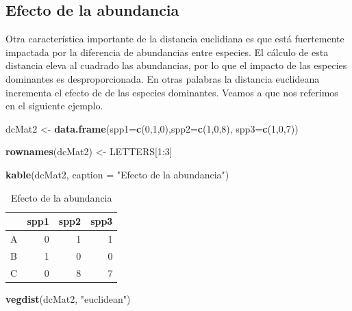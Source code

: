 \documentclass[]{book}
\newenvironment{Shaded}{\begin{snugshade}}{\end{snugshade}}
\newcommand{\KeywordTok}[1]{\textcolor[rgb]{0.13,0.29,0.53}{\textbf{{#1}}}}
\newcommand{\DataTypeTok}[1]{\textcolor[rgb]{0.13,0.29,0.53}{{#1}}}
\newcommand{\DecValTok}[1]{\textcolor[rgb]{0.00,0.00,0.81}{{#1}}}
\newcommand{\StringTok}[1]{\textcolor[rgb]{0.31,0.60,0.02}{{#1}}}
\newcommand{\NormalTok}[1]{{#1}}
\begin{document}
\subsection{Efecto de la abundancia}\label{efecto-de-la-abundancia}

Otra característica importante de la distancia euclidiana es que está
fuertemente impactada por la diferencia de abundancias entre especies.
El cálculo de esta distancia eleva al cuadrado las abundancias, por lo
que el impacto de las especies dominantes es desproporcionada. En otras
palabras la distancia euclideana incrementa el efecto de de las especies
dominantes. Veamos a que nos referimos en el siguiente ejemplo.

\begin{Shaded}
\begin{Highlighting}[]
\NormalTok{dcMat2 <-}\StringTok{ }\KeywordTok{data.frame}\NormalTok{(}\DataTypeTok{spp1=}\KeywordTok{c}\NormalTok{(}\DecValTok{0}\NormalTok{,}\DecValTok{1}\NormalTok{,}\DecValTok{0}\NormalTok{),}\DataTypeTok{spp2=}\KeywordTok{c}\NormalTok{(}\DecValTok{1}\NormalTok{,}\DecValTok{0}\NormalTok{,}\DecValTok{8}\NormalTok{),}
                    \DataTypeTok{spp3=}\KeywordTok{c}\NormalTok{(}\DecValTok{1}\NormalTok{,}\DecValTok{0}\NormalTok{,}\DecValTok{7}\NormalTok{))}

\KeywordTok{rownames}\NormalTok{(dcMat2) <-}\StringTok{ }\NormalTok{LETTERS[}\DecValTok{1}\NormalTok{:}\DecValTok{3}\NormalTok{]}

\KeywordTok{kable}\NormalTok{(dcMat2, }\DataTypeTok{caption =} \StringTok{"Efecto de la abundancia"}\NormalTok{)}
\end{Highlighting}
\end{Shaded}

\begin{table}[t]

\caption{\label{tab:unnamed-chunk-11}Efecto de la abundancia}
\centering
\begin{tabular}{l|r|r|r}
\hline
  & spp1 & spp2 & spp3\\
\hline
A & 0 & 1 & 1\\
\hline
B & 1 & 0 & 0\\
\hline
C & 0 & 8 & 7\\
\hline
\end{tabular}
\end{table}

\begin{Shaded}
\begin{Highlighting}[]
\KeywordTok{vegdist}\NormalTok{(dcMat2, }\StringTok{"euclidean"}\NormalTok{)}
\end{Highlighting}
\end{Shaded}
\end{document}
